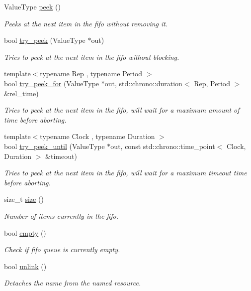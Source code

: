 \begin{DoxyCompactItemize}
Value\+Type \hyperlink{classcpen333_1_1process_1_1fifo_a785266ee082e1917198bd0d701b25e50}{peek} ()
\begin{DoxyCompactList}\small\item\em Peeks at the next item in the fifo without removing it. \end{DoxyCompactList}\item 
bool \hyperlink{classcpen333_1_1process_1_1fifo_a0518230659a2ec8568f05377f4e2e727}{try\+\_\+peek} (Value\+Type $\ast$out)
\begin{DoxyCompactList}\small\item\em Tries to peek at the next item in the fifo without blocking. \end{DoxyCompactList}\item 
{\footnotesize template$<$typename Rep , typename Period $>$ }\\bool \hyperlink{classcpen333_1_1process_1_1fifo_a61d351911485a6cef80404da4aa663ec}{try\+\_\+peek\+\_\+for} (Value\+Type $\ast$out, std\+::chrono\+::duration$<$ Rep, Period $>$ \&rel\+\_\+time)
\begin{DoxyCompactList}\small\item\em Tries to peek at the next item in the fifo, will wait for a maximum amount of time before aborting. \end{DoxyCompactList}\item 
{\footnotesize template$<$typename Clock , typename Duration $>$ }\\bool \hyperlink{classcpen333_1_1process_1_1fifo_ac587ec4df8ae29b25a3e21ac7114e335}{try\+\_\+peek\+\_\+until} (Value\+Type $\ast$out, const std\+::chrono\+::time\+\_\+point$<$ Clock, Duration $>$ \&timeout)
\begin{DoxyCompactList}\small\item\em Tries to peek at the next item in the fifo, will wait for a maximum timeout time before aborting. \end{DoxyCompactList}\item 
size\+\_\+t \hyperlink{classcpen333_1_1process_1_1fifo_aeaf7bd6333245fad222fcf088e589ad6}{size} ()
\begin{DoxyCompactList}\small\item\em Number of items currently in the fifo. \end{DoxyCompactList}\item 
bool \hyperlink{classcpen333_1_1process_1_1fifo_ae2ce36a0885d0c3ded0997ec2586aabe}{empty} ()
\begin{DoxyCompactList}\small\item\em Check if fifo queue is currently empty. \end{DoxyCompactList}\item 
bool \hyperlink{classcpen333_1_1process_1_1fifo_a85f9c252de8044d57568e99b64cbb860}{unlink} ()
\begin{DoxyCompactList}\small\item\em Detaches the name from the named resource. \end{DoxyCompactList}\end{DoxyCompactItemize}
